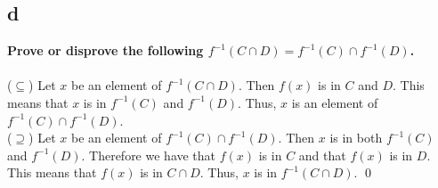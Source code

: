 \documentclass{article}
\begin{document}
\subsection*{d}
\textbf{Prove or disprove the following $f^{-1}(C \cap D) = f^{-1}(C) \cap f^{-1}(D)$.}\\
\proof\\
($\subseteq$) Let $x$ be an element of $f^{-1}(C \cap D)$. Then $f(x)$ is in $C$ and $D$. This means that $x$ is in $f^{-1}(C)$ and $f^{-1}(D)$. Thus, $x$ is an element of $f^{-1}(C) \cap f^{-1}(D)$.\\
($\supseteq$) Let $x$ be an element of  $f^{-1}(C) \cap f^{-1}(D)$. Then $x$ is in both $f^{-1}(C)$ and $f^{-1}(D)$. Therefore we have that $f(x)$ is in $C$ and that $f(x)$ is in $D$. This means that $f(x)$ is in $C \cap D$. Thus, $x$ is in $f^{-1}(C \cap D)$. \qed
\end{document}

